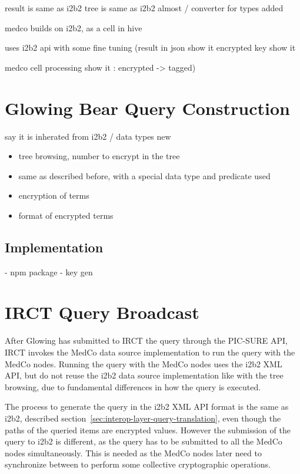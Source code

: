 result is same as i2b2
tree is same as i2b2 almost / converter for types added

medco builds on i2b2, as a cell in hive 

uses i2b2 api with some fine tuning 
(result in json show it 
encrypted key show it

medco cell processing show it : encrypted -> tagged)

\section{Glowing Bear Query Construction}
say it is inherated from i2b2 / 
data types new



\begin{itemize}
    \item tree browsing, number to encrypt in the tree
    \item same as described before, with a special data type and predicate used
    \item encryption of terms 
    \item format of encrypted terms
\end{itemize}


\subsection*{Implementation}

- npm package
- key gen


\section{IRCT Query Broadcast}

After Glowing has submitted to IRCT the query through the PIC-SURE API, IRCT invokes the MedCo data source implementation to run the query with the MedCo nodes.
Running the query with the MedCo nodes uses the i2b2 XML API, but do not reuse the i2b2 data source implementation like with the tree browsing, due to fundamental differences in how the query is executed.

The process to generate the query in the i2b2 XML API format is the same as i2b2, described section~\ref{sec:interop-layer-query-translation}, even though the paths of the queried items are encrypted values.
However the submission of the query to i2b2 is different, as the query has to be submitted to all the MedCo nodes simultaneously.
This is needed as the MedCo nodes later need to synchronize between to perform some collective cryptographic operations.


